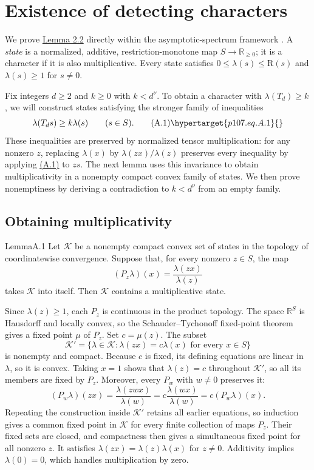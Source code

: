 \appendix
\section{Existence of detecting characters}\hypertarget{p107.sec.A}{}
We prove \hyperlink{p107.result.2.2}{Lemma 2.2} directly within the asymptotic-spectrum framework \cite{r16,r4}. A \emph{state} is a normalized, additive, restriction-monotone map $S\to\mathbb R_{\ge0}$; it is a character if it is also multiplicative. Every state satisfies $0\le\lambda(s)\le\mathrm R(s)$ and $\lambda(s)\ge1$ for $s\ne0$.

Fix integers $d\ge2$ and $k\ge0$ with $k<d^\nu$. To obtain a character with $\lambda(T_d)\ge k$, we will construct states satisfying the stronger family of inequalities
\begin{equation}
\lambda(T_ds)\ge k\lambda(s)\qquad(s\in S).
\tag{A.1}\hypertarget{p107.eq.A.1}{}
\end{equation}
These inequalities are preserved by normalized tensor multiplication: for any nonzero $z$, replacing $\lambda(x)$ by $\lambda(zx)/\lambda(z)$ preserves every inequality by applying \hyperlink{p107.eq.A.1}{(A.1)} to $zs$. The next lemma uses this invariance to obtain multiplicativity in a nonempty compact convex family of states. We then prove nonemptiness by deriving a contradiction to $k<d^\nu$ from an empty family.

\subsection{Obtaining multiplicativity}\hypertarget{p107.sec.A.1}{}
\begin{result}{Lemma}{A.1}{}
Let $\mathcal K$ be a nonempty compact convex set of states in the topology of coordinatewise convergence. Suppose that, for every nonzero $z\in S$, the map
\[
(P_z\lambda)(x)=\frac{\lambda(zx)}{\lambda(z)}
\]
takes $\mathcal K$ into itself. Then $\mathcal K$ contains a multiplicative state.
\end{result}
\begin{amsthmproof}
Since $\lambda(z)\ge1$, each $P_z$ is continuous in the product topology. The space $\mathbb R^S$ is Hausdorff and locally convex, so the Schauder--Tychonoff fixed-point theorem \cite{r17} gives a fixed point $\mu$ of $P_z$. Set $c=\mu(z)$. The subset
\[
\mathcal K'=\{\lambda\in\mathcal K:\lambda(zx)=c\lambda(x)\text{ for every }x\in S\}
\]
is nonempty and compact. Because $c$ is fixed, its defining equations are linear in $\lambda$, so it is convex. Taking $x=1$ shows that $\lambda(z)=c$ throughout $\mathcal K'$, so all its members are fixed by $P_z$. Moreover, every $P_w$ with $w\ne0$ preserves it:
\[
(P_w\lambda)(zx)=\frac{\lambda(zwx)}{\lambda(w)}=c\frac{\lambda(wx)}{\lambda(w)}=c(P_w\lambda)(x).
\]
Repeating the construction inside $\mathcal K'$ retains all earlier equations, so induction gives a common fixed point in $\mathcal K$ for every finite collection of maps $P_z$. Their fixed sets are closed, and compactness then gives a simultaneous fixed point for all nonzero $z$. It satisfies $\lambda(zx)=\lambda(z)\lambda(x)$ for $z\ne0$. Additivity implies $\lambda(0)=0$, which handles multiplication by zero.
\end{amsthmproof}

